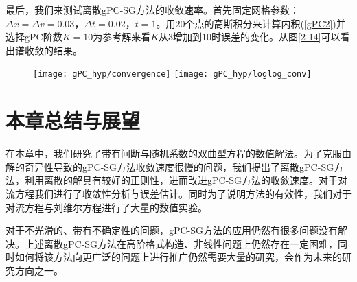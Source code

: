 最后，我们来测试离散gPC-SG方法的收敛速率。首先固定网格参数：$\Delta x = \Delta v = 0.03$，$\Delta t = 0.02$，$t=1$。用$20$个点的高斯积分来计算内积(\ref{gPC2})并选择gPC阶数$K=10$为参考解来看$K$从$3$增加到$10$时误差的变化。从图\ref{2-14}可以看出谱收敛的结果。
\begin{figure}
  \texttt{[image: gPC\_hyp/convergence]}
  \texttt{[image: gPC\_hyp/loglog\_conv]}
\end{figure}

\section{本章总结与展望}
在本章中，我们研究了带有间断与随机系数的双曲型方程的数值解法。为了克服由解的奇异性导致的gPC-SG方法收敛速度很慢的问题，我们提出了离散gPC-SG方法，利用离散的解具有较好的正则性，进而改进gPC-SG方法的收敛速度。对于对流方程我们进行了收敛性分析与误差估计。同时为了说明方法的有效性，我们对于对流方程与刘维尔方程进行了大量的数值实验。

对于不光滑的、带有不确定性的问题，gPC-SG方法的应用仍然有很多问题没有解决。上述离散gPC-SG方法在高阶格式构造、非线性问题上仍然存在一定困难，同时如何将该方法向更广泛的问题上进行推广仍然需要大量的研究，会作为未来的研究方向之一。

